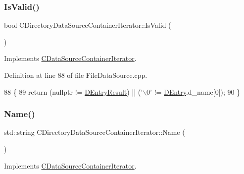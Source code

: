 \subsubsection{\texorpdfstring{Is\+Valid()}{IsValid()}}
{\footnotesize\ttfamily bool C\+Directory\+Data\+Source\+Container\+Iterator\+::\+Is\+Valid (\begin{DoxyParamCaption}{ }\end{DoxyParamCaption})\hspace{0.3cm}{\ttfamily [virtual]}}



Implements \hyperlink{classCDataSourceContainerIterator_ad1e2a9c6bde2f80ed03cb45085ce0441}{C\+Data\+Source\+Container\+Iterator}.



Definition at line 88 of file File\+Data\+Source.\+cpp.


\begin{DoxyCode}
88                                                    \{
89     \textcolor{keywordflow}{return} (\textcolor{keyword}{nullptr} != \hyperlink{classCDirectoryDataSourceContainerIterator_a7e8c1c50ef09013ee6013dcbd1bdc616}{DEntryResult}) || (\textcolor{charliteral}{'\(\backslash\)0'} != \hyperlink{classCDirectoryDataSourceContainerIterator_a69dfb8a9f2ab7f71e7d106d4d6c0e29b}{DEntry}.d\_name[0]);
90 \}
\end{DoxyCode}
\hypertarget{classCDirectoryDataSourceContainerIterator_a24631e9ef36d3cb075e42d38912049ec}{}\label{classCDirectoryDataSourceContainerIterator_a24631e9ef36d3cb075e42d38912049ec} 
\subsubsection{\texorpdfstring{Name()}{Name()}}
{\footnotesize\ttfamily std\+::string C\+Directory\+Data\+Source\+Container\+Iterator\+::\+Name (\begin{DoxyParamCaption}{ }\end{DoxyParamCaption})\hspace{0.3cm}{\ttfamily [virtual]}}



Implements \hyperlink{classCDataSourceContainerIterator_a95b57204a76fab1d5a75a01189d5fcc5}{C\+Data\+Source\+Container\+Iterator}.



